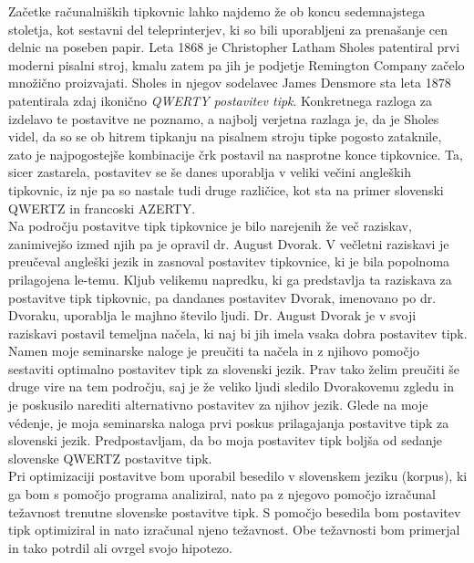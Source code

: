 

    Začetke računalniških tipkovnic lahko najdemo že ob koncu sedemnajstega stoletja,
    kot sestavni del teleprinterjev, ki so bili uporabljeni za prenašanje cen delnic na poseben papir.
    Leta 1868 je Christopher Latham Sholes patentiral prvi moderni pisalni stroj,
    kmalu zatem pa jih je podjetje Remington Company začelo množično proizvajati.
    Sholes in njegov sodelavec James Densmore sta leta 1878 patentirala zdaj ikonično
    \emph{QWERTY postavitev tipk}.
    Konkretnega razloga za izdelavo te postavitve ne poznamo, a najbolj verjetna razlaga je,
    da je Sholes videl, da so se ob hitrem tipkanju na pisalnem stroju tipke pogosto zataknile,
    zato je najpogostejše kombinacije črk postavil na nasprotne konce tipkovnice.
    Ta, sicer zastarela, postavitev se še danes uporablja v veliki večini angleških tipkovnic, iz nje pa so nastale
    tudi druge različice, kot sta na primer slovenski QWERTZ in francoski AZERTY\@. \\

    Na področju postavitve tipk tipkovnice je bilo narejenih že več raziskav,
    zanimivejšo izmed njih pa je opravil dr. August Dvorak.
    V večletni raziskavi je preučeval angleški jezik in zasnoval postavitev tipkovnice,
    ki je bila popolnoma prilagojena le-temu.
    Kljub velikemu napredku, ki ga predstavlja ta raziskava za postavitve tipk tipkovnic,
    pa dandanes postavitev Dvorak, imenovano po dr. Dvoraku, uporablja le majhno število ljudi.
    Dr. August Dvorak je v svoji raziskavi postavil temeljna načela, ki naj bi jih imela vsaka dobra postavitev tipk. \\

    Namen moje seminarske naloge je preučiti ta načela in z njihovo pomočjo sestaviti optimalno postavitev tipk
    za slovenski jezik.
    Prav tako želim preučiti še druge vire na tem področju, saj je že veliko ljudi sledilo Dvorakovemu zgledu
    in je poskusilo narediti alternativno postavitev za njihov jezik.
    Glede na moje védenje, je moja seminarska naloga prvi poskus prilagajanja postavitve tipk za slovenski jezik.
    Predpostavljam, da bo moja postavitev tipk boljša od sedanje slovenske QWERTZ postavitve tipk. \\

    Pri optimizaciji postavitve bom uporabil besedilo v slovenskem jeziku (korpus),
    ki ga bom s pomočjo programa analiziral, nato pa z njegovo pomočjo izračunal težavnost
    trenutne slovenske postavitve tipk.
    S pomočjo besedila bom postavitev tipk optimiziral in nato izračunal njeno težavnost.
    Obe težavnosti bom primerjal in tako potrdil ali ovrgel svojo hipotezo.

